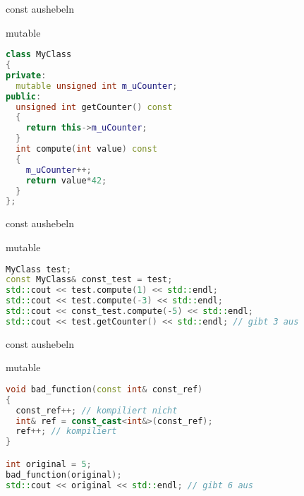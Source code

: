 
\begin{frame}[fragile]{const aushebeln}

\begin{block}{mutable}
\begin{small}
	\begin{lstlisting}[language=C++]
class MyClass
{
private:
  mutable unsigned int m_uCounter;
public:
  unsigned int getCounter() const
  {
    return this->m_uCounter;
  }
  int compute(int value) const
  {
    m_uCounter++;
    return value*42;
  }
};
	\end{lstlisting}
	\end{small}
\end{block}

\end{frame}


\begin{frame}[fragile]{const aushebeln}

\begin{block}{mutable}
\begin{small}
	\begin{lstlisting}[language=C++]
MyClass test;
const MyClass& const_test = test;
std::cout << test.compute(1) << std::endl;
std::cout << test.compute(-3) << std::endl;
std::cout << const_test.compute(-5) << std::endl;
std::cout << test.getCounter() << std::endl; // gibt 3 aus
	\end{lstlisting}
	\end{small}
\end{block}

\end{frame}

\begin{frame}[fragile]{const aushebeln}

\begin{block}{mutable}
\begin{small}
	\begin{lstlisting}[language=C++]
void bad_function(const int& const_ref)
{
  const_ref++; // kompiliert nicht
  int& ref = const_cast<int&>(const_ref);
  ref++; // kompiliert
}

int original = 5;
bad_function(original);
std::cout << original << std::endl; // gibt 6 aus
	\end{lstlisting}
	\end{small}
\end{block}

\end{frame}